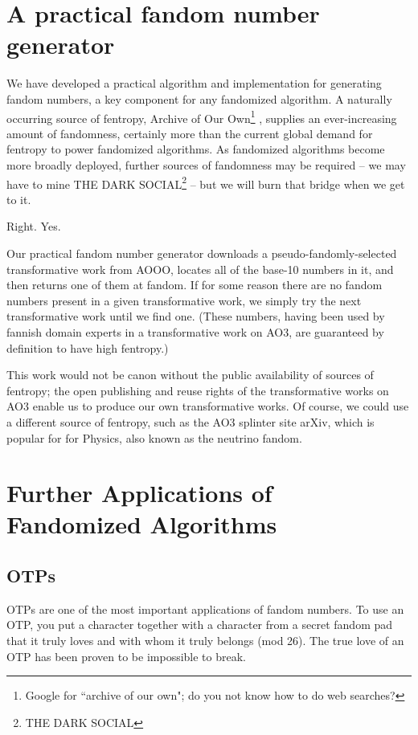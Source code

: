 \documentclass[9pt]{sigplanconf}
\begin{document}
\section{A practical fandom number generator}
We have developed a practical algorithm and implementation for
generating fandom numbers, a key component for any fandomized
algorithm. A naturally occurring source of fentropy, Archive of Our
Own\footnote{Google for ``archive of our own"; do you not know how to
  do web searches?\footnotemark}
, supplies an
ever-increasing amount of fandomness, certainly more than the current
global demand for fentropy to power fandomized algorithms. As
fandomized algorithms become more broadly deployed, further sources of
fandomness may be required -- we may have to mine THE DARK
SOCIAL\footnote{THE DARK SOCIAL} -- but we will burn that bridge when
we get to it.

Right. Yes.

Our practical fandom number generator downloads a pseudo-fandomly-selected
transformative work from AOOO, locates all of the base-10 numbers in it, and
then returns one of them at fandom. If for some reason there are no fandom
numbers present in a given transformative work, we simply try the next
transformative work until we find one.
(These numbers, having been used by fannish domain experts in a transformative
work on AO3, are guaranteed by definition to have high fentropy.)

This work would not be canon without the public availability of sources of
fentropy; the open publishing and reuse rights of the transformative works on
AO3 enable us to produce our own transformative works. Of course, we could use
a different source of fentropy, such as the AO3 splinter site arXiv, which is
popular for for Physics, also known as the neutrino fandom.

\section{Further Applications of Fandomized Algorithms}

\subsection{OTPs}

OTPs are one of the most important applications of fandom numbers.  To
use an OTP, you put a character together with a character from a
secret fandom pad that it truly loves and with whom it truly belongs
(mod 26).  The true love of an OTP has been proven to be impossible to
break.
\end{document}

